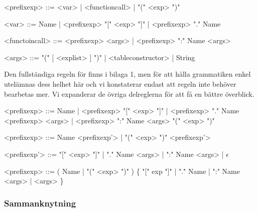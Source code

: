\begin{description}
  \setlength{\grammarindent}{8em}
  \item[Ursprungsregel] \hfill
    \begin{grammar}
      \singlespace\small%
      \selectfont
      <prefixexp> ::= <var> | <functioncall> | "(" <exp> ")"

      <var> ::= Name | <prefixexp> "[" <exp> "]" | <prefixexp> "." Name

      <functoincall> ::= <prefixexp> <args> | <prefixexp> ":" Name <args>

      <args> ::= "(" [ <explist> ] ")" | <tableconstructor> | String
    \end{grammar}

    Den fullständiga regeln för  finns i bilaga 1, men för
    att hålla grammatiken enkel utelämnas dess helhet här och vi konstaterar
    endast att regeln inte behöver bearbetas mer. Vi expanderar de övriga
    delreglerna för att få en bättre överblick.


    \begin{grammar}
      \singlespace\small%
      \selectfont
      <prefixexp> ::= Name | <prefixexp> "[" <exp> "]" | <prefixexp> "." Name
        \alt <prefixexp> <args> | <prefixexp> ":" Name <args>
        \alt "(" <exp> ")"
    \end{grammar}

  \item[Eliminering av vänsterrekursion] \hfill
    \begin{grammar}
      \singlespace\small%
      \selectfont
      <prefixexp> ::= Name <prefixexp'> | "(" <exp> ")" <prefixexp'>

      <prefixexp'> ::= "[" <exp> "]" | "." Name <args> | ":" Name <args> |
      $\epsilon$
    \end{grammar}

  \item[Resultat] \hfill
    \begin{grammar}
      \singlespace\small%
      \selectfont
      <prefixexp> ::= ( Name | "(" <exp> ")" ) \{ "[" exp "]" | "." Name |
          ":" Name <args> | <args> \}
    \end{grammar}
\end{description}

\subsubsection{Sammanknytning}

